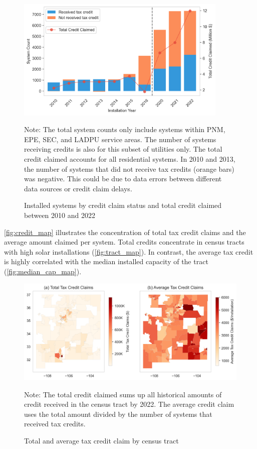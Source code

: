 \documentclass[12pt,twoside,letterpaper]{article}
\begin{document}
\begin{figure}[!ht]
    \centering
\includegraphics[width=0.9\textwidth]{figures/credit_claim.png}
    \caption{Installed systems by credit claim status and total credit claimed between 2010 and 2022}
    \label{fig:credit_claim}
      \begin{flushleft}
        \footnotesize Note: The total system counts only include systems within PNM, EPE, SEC, and LADPU service areas. The number of systems receiving credits is also for this subset of utilities only. The total credit claimed accounts for all residential systems. In 2010 and 2013, the number of systems that did not receive tax credits (orange bars) was negative. This could be due to data errors between different data sources or credit claim delays.
    \end{flushleft}
\end{figure}

\autoref{fig:credit_map} illustrates the concentration of total tax credit claims and the average amount claimed per system. Total credits concentrate in census tracts with high solar installations (\autoref{fig:tract_map}). In contrast, the average tax credit is highly correlated with the median installed capacity of the tract (\autoref{fig:median_cap_map}). 

\begin{figure}[!ht]
    \centering
\includegraphics[width=1\textwidth]{figures/credit_claim_maps.png}
    \caption{Total and average tax credit claim by census tract}
    \label{fig:credit_map}
      \begin{flushleft}
        \footnotesize Note: The total credit claimed sums up all historical amounts of credit received in the census tract by 2022. The average credit claim uses the total amount divided by the number of systems that received tax credits.
    \end{flushleft}
\end{figure}
\end{document}
